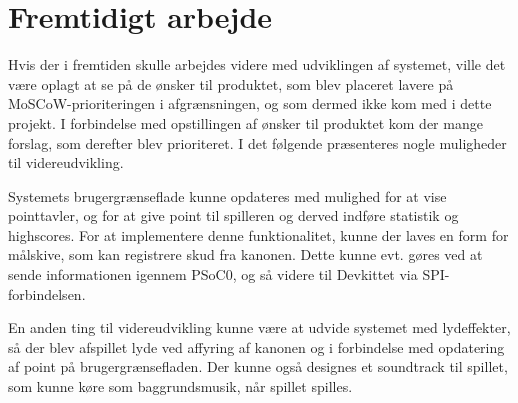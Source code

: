 \chapter{Fremtidigt arbejde}

\noindent Hvis der i fremtiden skulle arbejdes videre med udviklingen af systemet, ville det være oplagt at se på de ønsker til produktet, som blev placeret lavere på MoSCoW-prioriteringen i afgrænsningen, og som dermed ikke kom med i dette projekt. I forbindelse med opstillingen af ønsker til produktet kom der mange forslag, som derefter blev prioriteret. I det følgende præsenteres nogle muligheder til videreudvikling.  \newline

\noindent Systemets brugergrænseflade kunne opdateres med mulighed for at vise pointtavler, og for at give point til spilleren og derved indføre statistik og highscores. For at implementere denne funktionalitet, kunne der laves en form for målskive, som kan registrere skud fra kanonen. Dette kunne evt. gøres ved at sende informationen igennem PSoC0, og så videre til Devkittet via SPI-forbindelsen. \newline

\noindent En anden ting til videreudvikling kunne være at udvide systemet med lydeffekter, så der blev afspillet lyde ved affyring af kanonen og i forbindelse med opdatering af point på brugergrænsefladen. Der kunne også designes et soundtrack til spillet, som kunne køre som baggrundsmusik, når spillet spilles.\newline

 